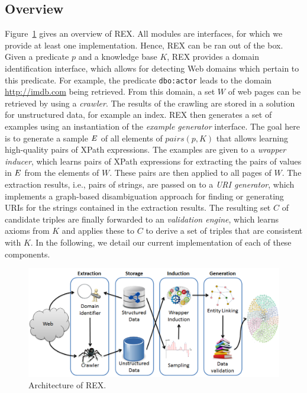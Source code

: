 \subsection{Overview}
Figure~\ref{charex:fig:architecture} gives an overview of REX. 
All modules are interfaces, for which we provide at least one implementation.
Hence, REX can be ran out of the box.
Given a predicate $p$ and a knowledge base $K$, REX provides a domain identification interface, which allows for detecting Web domains which pertain to this predicate.
For example, the predicate \texttt{dbo:actor} leads to the domain \url{http://imdb.com} being retrieved.
From this domain,  a set $W$ of web pages can be retrieved by using a \emph{crawler}.
The results of the crawling are stored in a solution for unstructured data, for example an index. 
REX then generates a set of examples using an instantiation of the \emph{example generator} interface. 
The goal here is to generate a sample $\mbox{\ensuremath{E}}$ of all elements of $pairs(p, K)$ that allows learning high-quality pairs of XPath expressions. 
The examples are given to a \emph{wrapper inducer}, which learns pairs of XPath expressions for extracting the pairs of values in $\mbox{\ensuremath{E}}$ from the elements of $W$. 
These pairs are then applied to all pages of $W$.
The extraction results, i.e., pairs of strings, are passed on to a \emph{URI generator}, which implements a graph-based disambiguation approach for finding or generating URIs for the strings contained in the extraction results.
The resulting set $C$ of candidate triples are finally forwarded to an \emph{validation engine}, which learns axioms from $K$ and applies these to $C$ to derive a set of triples that are consistent with $K$. 
In the following, we detail our current implementation of each of these components.  

\begin{figure}[htb]
\centering
\includegraphics[width = \textwidth]{part_02/semi_structured_annotation/ISWC_REX/rexArchitecture}
\caption{Architecture of REX.}
\label{charex:fig:architecture}
\end{figure}
